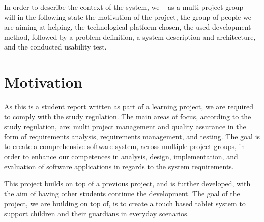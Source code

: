 In order to describe the context of the system, we -- as a multi project group -- will in the following state the motivation of the project, the group of people we are aiming at helping, the technological platform chosen, the used development method, followed by a problem definition, a system description and architecture, and the conducted usability test.

\section{Motivation}
As this is a student report written as part of a learning project, we are required to comply with the study regulation.
The main areas of focus, according to the study regulation, are: multi project management and quality assurance in the form of requirements analysis, requirements management, and testing.
The goal is to create a comprehensive software system, across multiple project groups, in order to enhance our competences in analysis, design, implementation, and evaluation of software applications in regards to the system requirements\cite{studyreg}.

This project builds on top of a previous project, and is further developed, with the aim of having other students continue the development.
The goal of the project, we are building on top of, is to create a touch based tablet system to support children and their guardians in everyday scenarios.